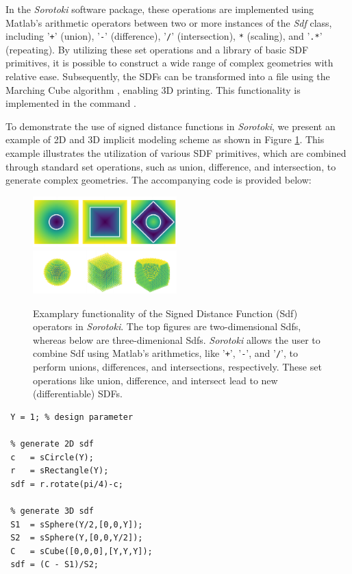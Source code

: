 In the \textit{Sorotoki} software package, these operations are implemented using Matlab's arithmetic operators between two or more instances of the \textit{Sdf} class, including '\texttt{+}' (union), '\texttt{-}' (difference), '\texttt{/}' (intersection), \texttt{*} (scaling), and '\texttt{.*}' (repeating). By utilizing these set operations and a library of basic SDF primitives, it is possible to construct a wide range of complex geometries with relative ease. Subsequently, the SDFs can be transformed into a  file using the Marching Cube algorithm \cite{Lorensen1987Aug}, enabling 3D printing. This functionality is implemented in the command . \\

\begin{example}
To demonstrate the use of signed distance functions in \textit{Sorotoki}, we present an example of 2D and 3D implicit modeling scheme as shown in Figure \ref{fig:C5:sdfexample}. This example illustrates the utilization of various SDF primitives, which are combined through standard set operations, such as union, difference, and intersection, to generate complex geometries. The accompanying code is provided below:
%
\begin{figure}[!t]
\centering
\includegraphics*[width=0.495\textwidth]{./pdf/thesis-figure-6-3-1.pdf}
\includegraphics*[width=0.495\textwidth]{./pdf/thesis-figure-6-3-2.pdf}
%
\caption{Examplary functionality of the Signed Distance Function (Sdf) operators in \textit{Sorotoki}. The top figures are two-dimensional Sdfs, whereas below are three-dimenional Sdfs. \textit{Sorotoki} allows the user to combine Sdf using Matlab's arithmetics, like '\texttt{+}', '\texttt{-}', and '\texttt{/}', to perform unions, differences, and intersections, respectively. These set operations like union, difference, and intersect lead to new (differentiable) SDFs.\label{fig:C5:sdfexample}}
\vspace{-3mm}
\end{figure}

\begin{lstlisting}[style=matlab] 
 %% EXAMPLE: Sdf class 
 Y = 1; % design parameter 

 % generate 2D sdf 
 c   = sCircle(Y);
 r   = sRectangle(Y);
 sdf = r.rotate(pi/4)-c;

 % generate 3D sdf
 S1  = sSphere(Y/2,[0,0,Y]);
 S2  = sSphere(Y,[0,0,Y/2]);
 C   = sCube([0,0,0],[Y,Y,Y]);
 sdf = (C - S1)/S2;
\end{lstlisting}
%
\end{example}

